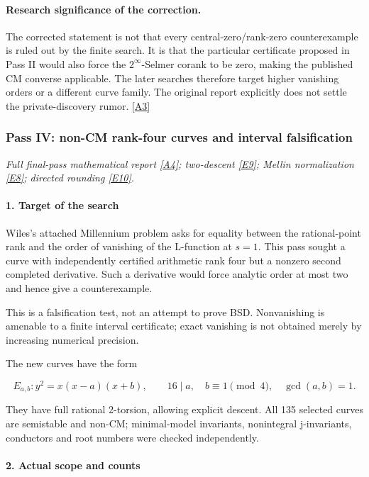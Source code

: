 \documentclass[11pt]{article}
\newcommand{\srcref}[1]{\hyperlink{source:#1}{[#1]}}
\begin{document}
\paragraph{Research significance of the correction.}
The corrected statement is not that every central-zero/rank-zero counterexample
is ruled out by the finite search. It is that the particular certificate proposed
in Pass II would also force the $2^\infty$-Selmer corank to be zero, making the
published CM converse applicable. The later searches therefore target higher
vanishing orders or a different curve family. The original report explicitly
does not settle the private-discovery rumor. \srcref{A3}

\subsubsection{Pass IV: non-CM rank-four curves and interval falsification}\label{pass4}
\textit{Full final-pass mathematical report \srcref{A4}; two-descent \srcref{E9}; Mellin normalization \srcref{E8}; directed rounding \srcref{E10}.}

\paragraph{1. Target of the search}

Wiles's attached Millennium problem asks for equality between the rational-point rank and the order of vanishing of the L-function at \(s=1\). This pass sought a curve with independently certified arithmetic rank four but a nonzero second completed derivative. Such a derivative would force analytic order at most two and hence give a counterexample.

This is a falsification test, not an attempt to prove BSD. Nonvanishing is amenable to a finite interval certificate; exact vanishing is not obtained merely by increasing numerical precision.

The new curves have the form

\[
E_{a,b}:y^2=x(x-a)(x+b),\qquad 16\mid a,\quad b\equiv1\pmod4,\quad\gcd(a,b)=1.
\]

They have full rational 2-torsion, allowing explicit descent. All 135 selected curves are semistable and non-CM; minimal-model invariants, nonintegral j-invariants, conductors and root numbers were checked independently.

\paragraph{2. Actual scope and counts}
\end{document}
